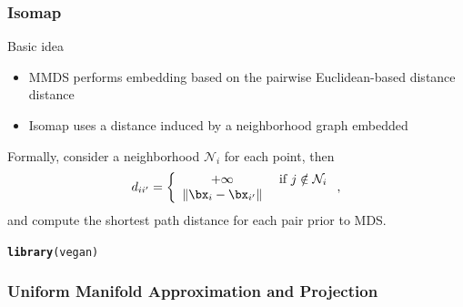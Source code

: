 \documentclass{beamer}\usepackage[]{graphicx}\usepackage[]{color}
\makeatletter
\newcommand{\hlstd}[1]{\textcolor[rgb]{0.345,0.345,0.345}{#1}}%
\newcommand{\hlkwd}[1]{\textcolor[rgb]{0.737,0.353,0.396}{\textbf{#1}}}%
\newenvironment{kframe}{%
 \def\at@end@of@kframe{}%
 \ifinner\ifhmode%
  \def\at@end@of@kframe{\end{minipage}}%
  \begin{minipage}{\columnwidth}%
 \fi\fi%
 \def\FrameCommand##1{\hskip\@totalleftmargin \hskip-\fboxsep
 \colorbox{shadecolor}{##1}\hskip-\fboxsep
     \hskip-\linewidth \hskip-\@totalleftmargin \hskip\columnwidth}%
 \MakeFramed {\advance\hsize-\width
   \@totalleftmargin\z@ \linewidth\hsize
   \@setminipage}}%
 {\par\unskip\endMakeFramed%
 \at@end@of@kframe}
\newenvironment{knitrout}{}{} %
\makeatother
\begin{document}
\begin{frame}
   \frametitle{Isomap}
 
   \begin{block}{Basic idea}
     \begin{itemize}
       \item MMDS performs embedding based on the pairwise Euclidean-based distance distance
       \item Isomap uses a distance induced by a neighborhood graph embedded
     \end{itemize}
   \end{block}
 
Formally, consider a neighborhood $\mathcal{N}_i$ for each point, then
\begin{equation*}
  d_{ii'} = \left\{
    \begin{array}{cc}
    + \infty & \text{ if }j \notin \mathcal{N}_i\\
    \| \bx_i - \bx_{i'} \|& \\
    \end{array}
  \right.,
\end{equation*}
 and compute the shortest path distance for each pair prior to MDS.
 
\begin{knitrout}\scriptsize
{}\color{fgcolor}\begin{kframe}
\begin{alltt}
\hlkwd{library}\hlstd{(vegan)}
\end{alltt}
\end{kframe}
\end{knitrout}
% 
\end{frame}

\begin{frame}
  \frametitle{Uniform Manifold Approximation and Projection }

\end{frame}
\end{document}
